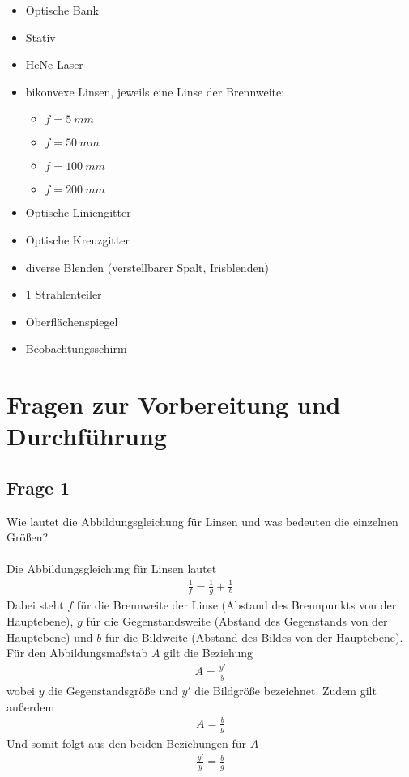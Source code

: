 \documentclass[a4paper,10pt]{scrartcl}
\begin{document}
  	\begin{itemize}  
  		\item Optische Bank
  		\item Stativ
  		\item HeNe-Laser
  		\item bikonvexe Linsen, jeweils eine Linse der Brennweite:
  			\begin{itemize}
  				\item $f = \SI{5}{mm}$
  				\item $f = \SI{50}{mm}$
  				\item $f = \SI{100}{mm}$
  				\item $f = \SI{200}{mm}$
  			\end{itemize}
  		\item Optische Liniengitter
  		\item Optische Kreuzgitter
  		\item diverse Blenden (verstellbarer Spalt, Irisblenden)
  		\item 1 Strahlenteiler
  		\item Oberflächenspiegel
  		\item Beobachtungsschirm
  	\end{itemize}
	
	\section{Fragen zur Vorbereitung und Durchführung}
		
		\subsection{Frage 1}
			Wie lautet die Abbildungsgleichung für Linsen und was bedeuten die einzelnen Größen?\\
			\\
			Die Abbildungsgleichung für Linsen lautet 
			\begin{align*}
			\frac{1}{f}=\frac{1}{g}+\frac{1}{b}
			\end{align*}
			Dabei steht \(f\) für die Brennweite der Linse (Abstand des Brennpunkts von der Hauptebene), \(g\) für die Gegenstandsweite (Abstand des Gegenstands von der Hauptebene) und \(b\) für die Bildweite (Abstand des Bildes von der Hauptebene).\\
			Für den Abbildungsmaßstab \(A\) gilt die Beziehung
			\begin{align*}
			A=\frac{y'}{y}
			\end{align*}
			wobei \(y\) die Gegenstandsgröße und \(y'\) die Bildgröße bezeichnet. Zudem gilt außerdem
			\begin{align*}
			A=\frac{b}{g}
			\end{align*}
			Und somit folgt aus den beiden Beziehungen für \(A\)
			\begin{align*}
			\frac{y'}{y}=\frac{b}{g}
			\end{align*}
			
\end{document}
